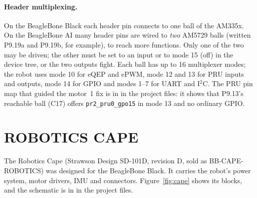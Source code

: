 \paragraph{Header multiplexing.} On the BeagleBone Black each header pin
connects to one ball of the AM335x. On the BeagleBone AI many header pins are
wired to \emph{two} AM5729 balls (written P9.19a and P9.19b, for example), to
reach more functions. Only one of the two may be driven; the other must be set
to an input or to mode 15 (off) in the device tree, or the two outputs fight.
Each ball has up to 16 multiplexer modes; the robot uses mode 10 for eQEP and
ePWM, mode 12 and 13 for PRU inputs and outputs, mode 14 for GPIO and modes
1--7 for UART and I$^2$C. The PRU pin map that guided the motor~1 fix is in
 in the project files: it shows that
P9.13's reachable ball (C17) offers \texttt{pr2\_pru0\_gpo15} in mode 13 and
no ordinary GPIO.

\section{ROBOTICS CAPE}
\label{sec:cape}

The Robotics Cape (Strawson Design SD-101D, revision D, sold as
BB-CAPE-ROBOTICS) was designed for the BeagleBone Black. It carries the
robot's power system, motor drivers, IMU and connectors.
Figure~\ref{fig:cape} shows its blocks, and the schematic is in
 in the project files.

